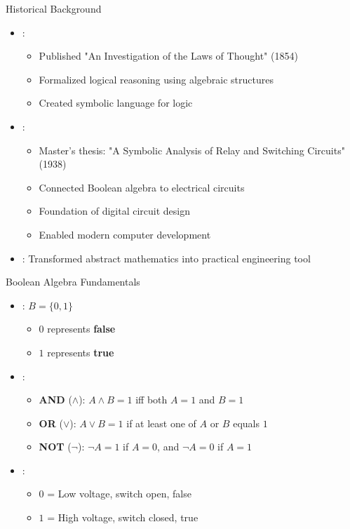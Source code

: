 \begin{frame}{Historical Background}
\begin{itemize}
\item {}:
\begin{itemize}
\item Published "An Investigation of the Laws of Thought" (1854)
\item Formalized logical reasoning using algebraic structures
\item Created symbolic language for logic
\end{itemize}
\vspace{0.5cm}
\item {}:
\begin{itemize}
\item Master's thesis: "A Symbolic Analysis of Relay and Switching Circuits" (1938)
\item Connected Boolean algebra to electrical circuits
\item Foundation of digital circuit design
\item Enabled modern computer development
\end{itemize}
\vspace{0.3cm}
\item {}: Transformed abstract mathematics into practical engineering tool
\end{itemize}
\end{frame}

\begin{frame}{Boolean Algebra Fundamentals}
\begin{itemize}
\item {}: $B = \{0, 1\}$
\begin{itemize}
\item $0$ represents \textbf{false}
\item $1$ represents \textbf{true}
\end{itemize}
\vspace{0.5cm}
\item {}:
\begin{itemize}
\item \textbf{AND} ($\land$): $A \land B = 1$ iff both $A = 1$ and $B = 1$
\item \textbf{OR} ($\lor$): $A \lor B = 1$ if at least one of $A$ or $B$ equals $1$
\item \textbf{NOT} ($\neg$): $\neg A = 1$ if $A = 0$, and $\neg A = 0$ if $A = 1$
\end{itemize}
\vspace{0.3cm}
\item {}:
\begin{itemize}
\item $0$ = Low voltage, switch open, false
\item $1$ = High voltage, switch closed, true
\end{itemize}
\end{itemize}
\end{frame}

